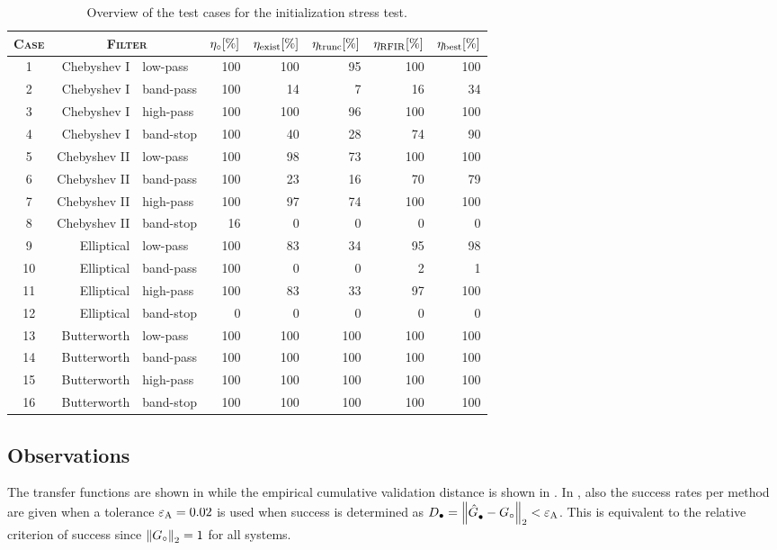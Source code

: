 \begin{table}
  \centering
  \caption{Overview of the test cases for the initialization stress test.}
\begin{tabular}{crlrrrrr}
\toprule
\textsc{Case}   &  \multicolumn{2}{c}{\textsc{Filter}}   &  $\true{\successRate} [\%]$  &  $\successRate_{\mathrm{exist}} [\%]$ &  $\successRate_{\mathrm{trunc}} [\%]$   &  $\successRate_{\mathrm{RFIR}} [\%]$  &  $\successRate_{\mathrm{best}} [\%]$ \\
\midrule
1  &  {Chebyshev I}  &  low-pass   & 100 & 100 & 95  & 100 & 100\\
2  &  {Chebyshev I}  &  band-pass   & 100 & 14  & 7 & 16  & 34\\
3  &  {Chebyshev I}  &  high-pass     & 100 & 100 & 96  & 100 & 100\\
4  &  {Chebyshev I}  &  band-stop     & 100 & 40  & 28  & 74  & 90\\
5  &  {Chebyshev II}   &  low-pass     & 100 & 98  & 73  & 100 & 100\\
6  &  {Chebyshev II}   &  band-pass     & 100 & 23  & 16  & 70  & 79\\
7  &  {Chebyshev II}   &  high-pass     & 100 & 97  & 74  & 100 & 100\\
8  &  {Chebyshev II}   &  band-stop     & 16  & 0 & 0 & 0 & 0\\
9  &  Elliptical   &  low-pass     & 100 & 83  & 34  & 95  & 98\\
10   &  Elliptical   &  band-pass     & 100 & 0 & 0 & 2 & 1\\
11   &  Elliptical   &  high-pass     & 100 & 83  & 33  & 97  & 100\\
12   &  Elliptical   &  band-stop     & 0 & 0 & 0 & 0 & 0\\
13   &  Butterworth  &  low-pass     & 100 & 100 & 100 & 100 & 100\\
14   &  Butterworth  &  band-pass     & 100 & 100 & 100 & 100 & 100\\
15   &  Butterworth  &  high-pass     & 100 & 100 & 100 & 100 & 100\\
16   &  Butterworth  &  band-stop     & 100 & 100 & 100 & 100 & 100\\
\bottomrule
\end{tabular}
\label{tbl:init:stresstest}
\end{table}

\subsection{Observations}
The transfer functions are shown in  while the empirical cumulative validation distance is shown in .
In , also the success rates per method are given when a tolerance $\absoluteTolerance = 0.02$ is used when success is determined as $D_{\bullet} = \norm[2]{\model{\bullet} - \true{G}} < \absoluteTolerance$.
This is equivalent to the relative criterion of success since $\norm[2]{\true{G}} = 1$ for all systems.

